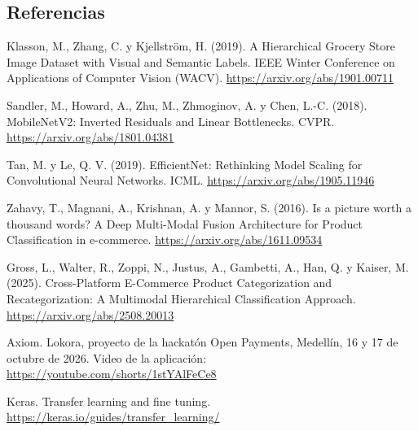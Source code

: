 \documentclass[11pt,a4paper]{article}
\begin{document}
\subsection*{Referencias}
\noindent [1] Klasson, M., Zhang, C. y Kjellström, H. (2019). A Hierarchical Grocery Store Image Dataset with Visual and Semantic Labels. IEEE Winter Conference on Applications of Computer Vision (WACV). \url{https://arxiv.org/abs/1901.00711}\par
\noindent [2] Sandler, M., Howard, A., Zhu, M., Zhmoginov, A. y Chen, L.-C. (2018). MobileNetV2: Inverted Residuals and Linear Bottlenecks. CVPR. \url{https://arxiv.org/abs/1801.04381}\par
\noindent [3] Tan, M. y Le, Q. V. (2019). EfficientNet: Rethinking Model Scaling for Convolutional Neural Networks. ICML. \url{https://arxiv.org/abs/1905.11946}\par
\noindent [4] Zahavy, T., Magnani, A., Krishnan, A. y Mannor, S. (2016). Is a picture worth a thousand words? A Deep Multi-Modal Fusion Architecture for Product Classification in e-commerce. \url{https://arxiv.org/abs/1611.09534}\par
\noindent [5] Gross, L., Walter, R., Zoppi, N., Justus, A., Gambetti, A., Han, Q. y Kaiser, M. (2025). Cross-Platform E-Commerce Product Categorization and Recategorization: A Multimodal Hierarchical Classification Approach. \url{https://arxiv.org/abs/2508.20013}\par
\noindent [6] Axiom. Lokora, proyecto de la hackatón Open Payments, Medellín, 16 y 17 de octubre de 2026. Video de la aplicación: \url{https://youtube.com/shorts/1stYAlFeCe8}\par
\noindent [7] Keras. Transfer learning and fine tuning. \url{https://keras.io/guides/transfer_learning/}\par
\end{document}
